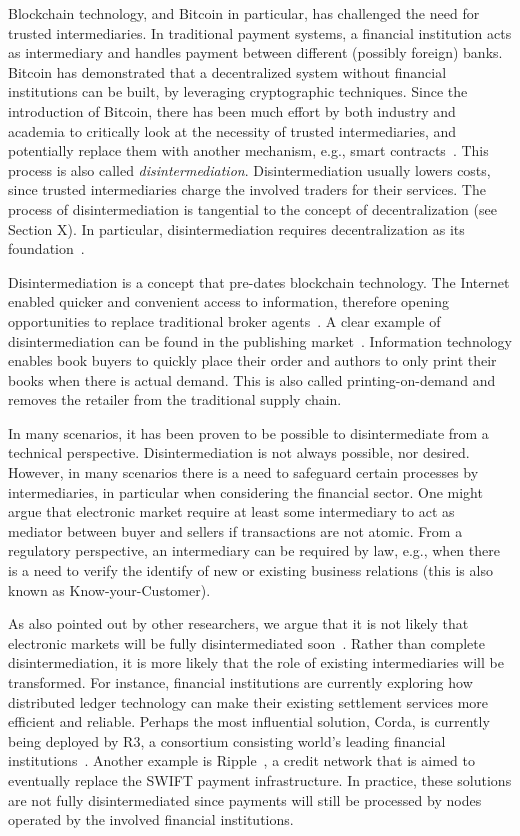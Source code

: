 Blockchain technology, and Bitcoin in particular, has challenged the need for trusted intermediaries.
In traditional payment systems, a financial institution acts as intermediary and handles payment between different (possibly foreign) banks.
Bitcoin has demonstrated that a decentralized system without financial institutions can be built, by leveraging cryptographic techniques.
Since the introduction of Bitcoin, there has been much effort by both industry and academia to critically look at the necessity of trusted intermediaries, and potentially replace them with another mechanism, e.g., smart contracts~\cite{lande2018sok}.
This process is also called \emph{disintermediation}.
Disintermediation usually lowers costs, since trusted intermediaries charge the involved traders for their services.
The process of disintermediation is tangential to the concept of decentralization (see Section X).
In particular, disintermediation requires decentralization as its foundation~\cite{guo2016blockchain}.

Disintermediation is a concept that pre-dates blockchain technology.
The Internet enabled quicker and convenient access to information, therefore opening opportunities to replace traditional broker agents~\cite{wigand2020whatever}.
A clear example of disintermediation can be found in the publishing market~\cite{giaglis1999disintermediation}.
Information technology enables book buyers to quickly place their order and authors to only print their books when there is actual demand.
This is also called printing-on-demand and removes the retailer from the traditional supply chain.

In many scenarios, it has been proven to be possible to disintermediate from a technical perspective.
Disintermediation is not always possible, nor desired.
However, in many scenarios there is a need to safeguard certain processes by intermediaries, in particular when considering the financial sector.
One might argue that electronic market require at least some intermediary to act as mediator between buyer and sellers if transactions are not atomic.
From a regulatory perspective, an intermediary can be required by law, e.g., when there is a need to verify the identify of new or existing business relations (this is also known as Know-your-Customer).

As also pointed out by other researchers, we argue that it is not likely that electronic markets will be fully disintermediated soon~\cite{zamani2018little}.
Rather than complete disintermediation, it is more likely that the role of existing intermediaries will be transformed.
For instance, financial institutions are currently exploring how distributed ledger technology can make their existing settlement services more efficient and reliable.
Perhaps the most influential solution, Corda, is currently being deployed by R3, a consortium consisting world's leading financial institutions~\cite{brown2016introducing}.
Another example is Ripple~\cite{armknecht2015ripple}, a credit network that is aimed to eventually replace the SWIFT payment infrastructure.
In practice, these solutions are not fully disintermediated since payments will still be processed by nodes operated by the involved financial institutions.


